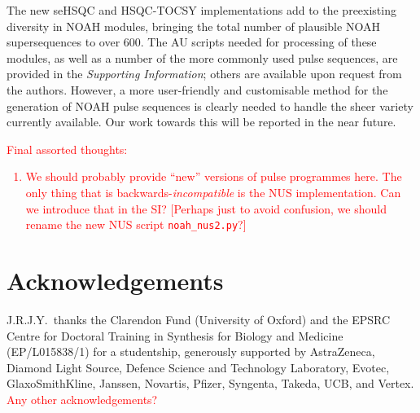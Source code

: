 \documentclass[11pt]{article}
\newcommand*{\red}[1]{\textcolor{red}{#1}}
\newcommand*{\SInf}{\textit{Supporting Information}}
\begin{document}
The new seHSQC and HSQC-TOCSY implementations add to the preexisting diversity in NOAH modules, bringing the total number of plausible NOAH supersequences to over 600.
The AU scripts needed for processing of these modules, as well as a number of the more commonly used pulse sequences, are provided in the \SInf{}; others are available upon request from the authors.
However, a more user-friendly and customisable method for the generation of NOAH pulse sequences is clearly needed to handle the sheer variety currently available.
Our work towards this will be reported in the near future.

\red{
    Final assorted thoughts:
    \begin{enumerate}
        \item We should probably provide ``new'' versions of pulse programmes here. The only thing that is backwards-\textit{incompatible} is the NUS implementation. Can we introduce that in the SI? [Perhaps just to avoid confusion, we should rename the new NUS script \texttt{noah\_nus2.py}?]
    \end{enumerate}
}


\section*{Acknowledgements}

J.R.J.Y.\ thanks the Clarendon Fund (University of Oxford) and the EPSRC Centre for Doctoral Training in Synthesis for Biology and Medicine (EP/L015838/1) for a studentship, generously supported by AstraZeneca, Diamond Light Source, Defence Science and Technology Laboratory, Evotec, GlaxoSmithKline, Janssen, Novartis, Pfizer, Syngenta, Takeda, UCB, and Vertex.
\red{Any other acknowledgements?}

\printbibliography


\end{document}
